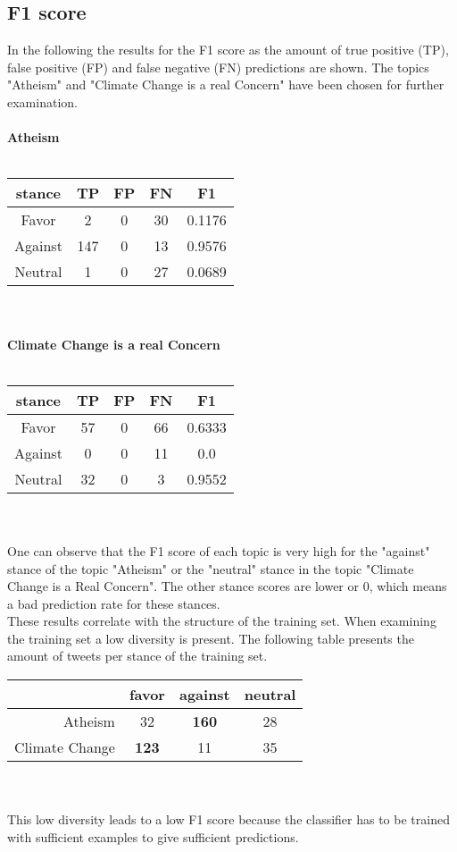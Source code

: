 \documentclass[a4paper,12pt,twoside]{article}
\begin{document}
\subsection{F1 score}
In the following the results for the F1 score as the amount of true positive (TP), false positive (FP) and false negative (FN) predictions are shown. The topics "Atheism" and "Climate Change is a real Concern" have been chosen for further examination.\\
\\
\textbf{Atheism}\\
\\
\begin{tabular}{c|ccc|c}
stance & TP & FP & FN & F1\\ \hline
Favor & 2 & 0 & 30 & 0.1176\\
Against & 147 & 0 & 13 & 0.9576 \\
Neutral & 1 & 0 & 27 & 0.0689\\
\end{tabular}\\
\\
\textbf{Climate Change is a real Concern} \\
\\
\begin{tabular}{c|ccc|c}
stance & TP & FP & FN & F1\\ \hline
Favor & 57 & 0 & 66 & 0.6333\\
Against & 0 & 0 & 11 & 0.0\\
Neutral & 32 & 0 & 3 & 0.9552 \\
\end{tabular}\\
\\
One can observe that the F1 score of each topic is very high for the "against" stance of the topic "Atheism" or the "neutral" stance in the topic "Climate Change is a Real Concern". The other stance scores are lower or 0, which means a bad prediction rate for these stances.\\
These results correlate with the structure of the training set. When examining the training set a low diversity is present. The following table presents the amount of tweets per stance of the training set.\\

\begin{tabular}{r|ccc}
& favor & against & neutral\\ \hline
Atheism & 32 & \textbf{160} & 28 \\
Climate Change & \textbf{123} & 11 & 35 \\
\end{tabular} \\
\\
This low diversity leads to a low F1 score because the classifier has to be trained with sufficient examples to give sufficient predictions.\\
\\
\end{document}
